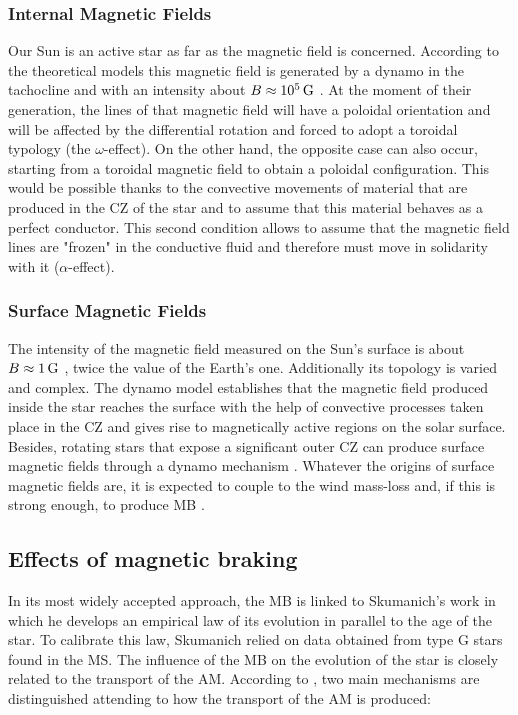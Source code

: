\documentclass[fleqn,usenatbib]{mnras}
\begin{document}
\subsubsection{Internal Magnetic Fields}
Our Sun is an active star as far as the magnetic field is concerned. According to the theoretical models this magnetic field is generated by a dynamo in the tachocline and with an intensity about $B\approx10^{5}\,\mathrm{G}$ \citep{Maeder2003a,Dudorov2014}. At the moment of their generation, the lines of that magnetic field will have a poloidal orientation and will be affected by the differential rotation and forced to adopt a toroidal typology (the $\omega$-effect). On the other hand, the opposite case can also occur, starting from a toroidal magnetic field to obtain a poloidal configuration. This would be possible thanks to the convective movements of material that are produced in the CZ of the star and to assume that this material behaves as a perfect conductor. This second condition allows to assume that the magnetic field lines are "frozen" in the conductive fluid and therefore must move in solidarity with it ($\alpha$-effect).\par

\subsubsection{Surface Magnetic Fields} \label{surf_mf}
The intensity of the magnetic field measured on the Sun's surface is about $B\approx1\,\mathrm{G}$ \citep{Weber1967,DAntona2000,Morin2012}, twice the value of the Earth's one. Additionally its topology is varied and complex. The dynamo model establishes that the magnetic field produced inside the star reaches the surface with the help of convective processes taken place in the CZ and gives rise to magnetically active regions on the solar surface. Besides, rotating stars that expose a significant outer CZ can produce surface magnetic fields through a dynamo mechanism \citep[e.g.][]{Brandenburg2004,Charbonneau2010,Brun2017}. Whatever the origins of surface magnetic fields are, it is expected to couple to the wind mass-loss and, if this is strong enough, to produce MB \citep[e.g.][]{UdDoula2002,Ud-Doula2007,Ud-Doula2008,Meynet2010}.\par

\subsection{Effects of magnetic braking}
In its most widely accepted approach, the MB is linked to Skumanich's work \citep{Skumanich1972} in which he develops an empirical law of its evolution in parallel to the age of the star. To calibrate this law, Skumanich relied on data obtained from type G stars found in the MS. The influence of the MB on the evolution of the star is closely related to the transport of the AM. According to \citet{Meynet2010}, two main mechanisms are distinguished attending to how the transport of the AM is produced:
\end{document}
